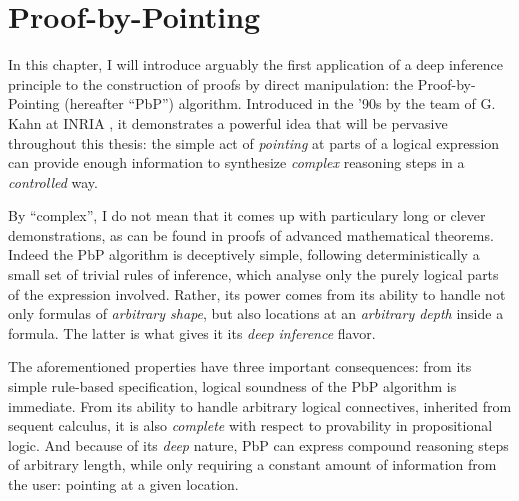 \setchapterpreamble[u]{\margintoc}
\chapter{Proof-by-Pointing}

In this chapter, I will introduce arguably the first application of a deep
inference principle to the construction of proofs by direct manipulation: the
Proof-by-Pointing (hereafter ``PbP'') algorithm. Introduced in the '90s by the
team of G. Kahn at INRIA \cite{PbP}, it demonstrates a powerful idea that will
be pervasive throughout this thesis: the simple act of \emph{pointing} at parts
of a logical expression can provide enough information to synthesize
\emph{complex} reasoning steps in a \emph{controlled} way.

By ``complex'', I do not mean that it comes up with particulary long or clever
demonstrations, as can be found in proofs of advanced mathematical theorems.
Indeed the PbP algorithm is deceptively simple, following deterministically a
small set of trivial rules of inference, which analyse only the purely logical
parts of the expression involved.
Rather, its power comes from its ability to handle not only formulas of
\emph{arbitrary shape}, but also locations at an \emph{arbitrary depth} inside a
formula. The latter is what gives it its \emph{deep inference} flavor.

The aforementioned properties have three important consequences: from its simple
rule-based specification, logical soundness of the PbP algorithm is immediate.
From its ability to handle arbitrary logical connectives, inherited from sequent
calculus, it is also \emph{complete} with respect to provability in
propositional logic. And because of its \emph{deep} nature,
PbP can express compound reasoning steps of arbitrary length, while only
requiring a constant amount of information from the user: pointing at a given
location.

